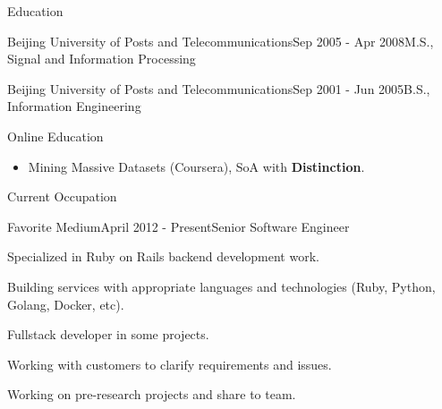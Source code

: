 \documentclass{resume} %
\begin{document}
\begin{rSection}{Education}
\begin{rSubsection}{Beijing University of Posts and Telecommunications}{Sep 2005 - Apr 2008}{M.S., Signal and Information Processing}{}
\end{rSubsection}

\begin{rSubsection}{Beijing University of Posts and Telecommunications}{Sep 2001 - Jun 2005}{B.S., Information Engineering}{}
\end{rSubsection}

\begin{rSubsection}{Online Education}{}{}{}
  \begin{itemize}\vspace{-0.6em}
    \item Mining Massive Datasets (Coursera), SoA with \textbf{Distinction}.
  \end{itemize}
\end{rSubsection}

\end{rSection}



\begin{rSection}{Current Occupation}

\begin{rSubsection}{Favorite Medium}{April 2012 - Present}{Senior Software Engineer}{}{}
\begin{rSubsectionList}
\item Specialized in Ruby on Rails backend development work.
\item Building services with appropriate languages and technologies (Ruby, Python, Golang, Docker, etc).
\item Fullstack developer in some projects.
\item Working with customers to clarify requirements and issues.
\item Working on pre-research projects and share to team.
\end{rSubsectionList}
\end{rSubsection}
\end{rSection}
\end{document}
